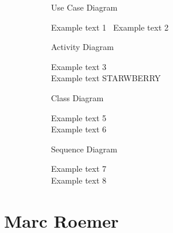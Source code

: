 \documentclass{article}
\begin{document}
	\begin{figure}[htbp]
		\centering
		\begin{subfigure}{\textwidth}
			\resizebox{\textwidth}{!}{}
			\caption{Use Case Diagram}
		\end{subfigure}
		\begin{subfigure}{\textwidth}
			Example text 1 \
			Example text 2
		\end{subfigure}
	\end{figure}
	
	\begin{figure}[htbp]
		\centering
		\begin{subfigure}{\textwidth}
			\resizebox{\textwidth}{!}{}
			\caption{Activity Diagram}
		\end{subfigure}
		\begin{subfigure}{\textwidth}
			Example text 3 \\
			Example text STARWBERRY 
		\end{subfigure}
	\end{figure}
	
	\begin{figure}[htbp]
		\centering
		\begin{subfigure}{\textwidth}
			\resizebox{\textwidth}{!}{}
			\caption{Class Diagram}
		\end{subfigure}
		\begin{subfigure}{\textwidth}
			Example text 5 \\
			Example text 6 
		\end{subfigure}
	\end{figure}
	
	\begin{figure}[htbp]
		\centering
		\begin{subfigure}{\textwidth}
			\resizebox{\textwidth}{!}{}
			\caption{Sequence Diagram}
		\end{subfigure}
		\begin{subfigure}{\textwidth}
			Example text 7 \\
			Example text 8
		\end{subfigure}
	\end{figure}
\newpage


\section{Marc Roemer}
\end{document}
